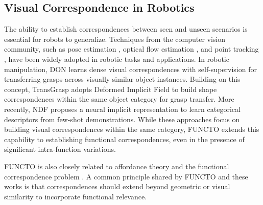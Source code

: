 \subsection{Visual Correspondence in Robotics}
The ability to establish correspondences \cite{zhang2024tale} between seen and unseen scenarios is essential for robots to generalize. Techniques from the computer vision community, such as pose estimation \cite{wen2024foundationpose}, optical flow estimation \cite{bailer2017cnn}, and point tracking \cite{karaev2025cotracker}, have been widely adopted in robotic tasks and applications. In robotic manipulation, DON \cite{florence2018dense} learns dense visual correspondences with self-supervision for transferring grasps across visually similar object instances. Building on this concept, TransGrasp \cite{wen2022transgrasp} adopts Deformed Implicit Field \cite{deng2021deformed} to build shape correspondences within the same object category for grasp transfer. More recently, NDF \cite{simeonov2022neural} proposes a neural implicit representation to learn categorical descriptors from few-shot demonstrations. While these approaches focus on building visual correspondences within the same category, FUNCTO extends this capability to establishing functional correspondences, even in the presence of significant intra-function variations. 

FUNCTO is also closely related to affordance theory \cite{gibson1977theory} and the functional correspondence problem \cite{lai2021functional}. A common principle shared by FUNCTO and these works is that correspondences should extend beyond geometric or visual similarity to incorporate functional relevance.



















